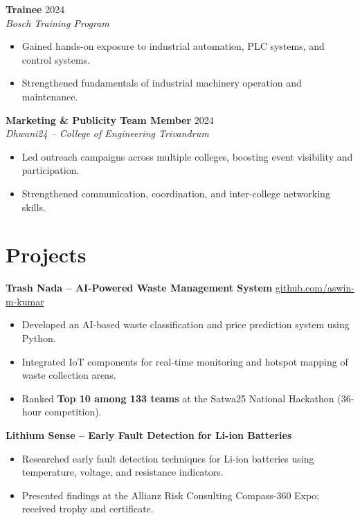 \documentclass[a4paper,11pt]{article}
\begin{document}
\vspace{4pt}
\noindent
\textbf{Trainee} \hfill 2024\\
\textit{Bosch Training Program}
\begin{itemize}
  \item Gained hands-on exposure to industrial automation, PLC systems, and control systems.
  \item Strengthened fundamentals of industrial machinery operation and maintenance.
\end{itemize}

\vspace{4pt}
\noindent
\textbf{Marketing \& Publicity Team Member} \hfill 2024\\
\textit{Dhwani24 -- College of Engineering Trivandrum}
\begin{itemize}
  \item Led outreach campaigns across multiple colleges, boosting event visibility and participation.
  \item Strengthened communication, coordination, and inter-college networking skills.
\end{itemize}


\section{Projects}

\noindent
\textbf{Trash Nada -- AI-Powered Waste Management System} \hfill \href{https://github.com/aswin-m-kumar}{github.com/aswin-m-kumar}
\begin{itemize}
  \item Developed an AI-based waste classification and price prediction system using Python.
  \item Integrated IoT components for real-time monitoring and hotspot mapping of waste collection areas.
  \item Ranked \textbf{Top 10 among 133 teams} at the Satwa25 National Hackathon (36-hour competition).
\end{itemize}

\vspace{4pt}
\noindent
\textbf{Lithium Sense -- Early Fault Detection for Li-ion Batteries}
\begin{itemize}
  \item Researched early fault detection techniques for Li-ion batteries using temperature, voltage, and resistance indicators.
  \item Presented findings at the Allianz Risk Consulting Compass-360 Expo; received trophy and certificate.
\end{itemize}
\end{document}

